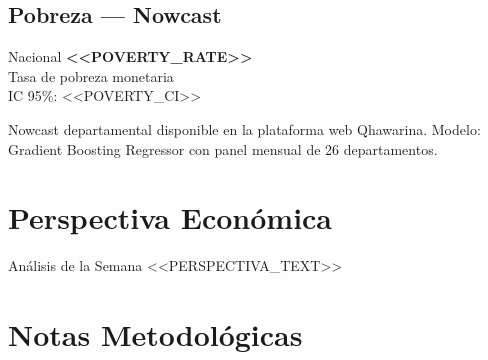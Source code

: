 \documentclass[10pt,a4paper]{article}
\newcommand{\kpivalue}[1]{%
  {\fontsize{16}{18}\selectfont\bfseries\color{ink}#1}%
}
\newcommand{\kpilabel}[1]{%
  {\small\color{ink3}#1}%
}
\begin{document}
\vspace{0.8em}

\subsection{Pobreza — Nowcast}

\noindent
\begin{minipage}[t]{0.49\textwidth}
  \begin{kpibox}{Nacional}
    \kpivalue{<<POVERTY_RATE>>}\\[2pt]
    \kpilabel{Tasa de pobreza monetaria}\\[4pt]
    \kpilabel{IC 95\%: <<POVERTY_CI>>}
  \end{kpibox}
\end{minipage}%
\hfill
\begin{minipage}[t]{0.49\textwidth}
  \begin{tcolorbox}[
    enhanced,
    colback=white,
    colframe=border,
    boxrule=0.5pt,
    arc=2pt,
    left=8pt, right=8pt, top=6pt, bottom=6pt,
  ]
    {\footnotesize\color{ink3}
      Nowcast departamental disponible en la plataforma web Qhawarina.
      Modelo: Gradient Boosting Regressor con panel mensual de 26 departamentos.
    }
  \end{tcolorbox}
\end{minipage}

\newpage

\section{Perspectiva Económica}

\begin{sectionbox}{Análisis de la Semana}
  \small\color{ink}
  <<PERSPECTIVA_TEXT>>
\end{sectionbox}

\vspace{1em}

\section{Notas Metodológicas}
\end{document}
